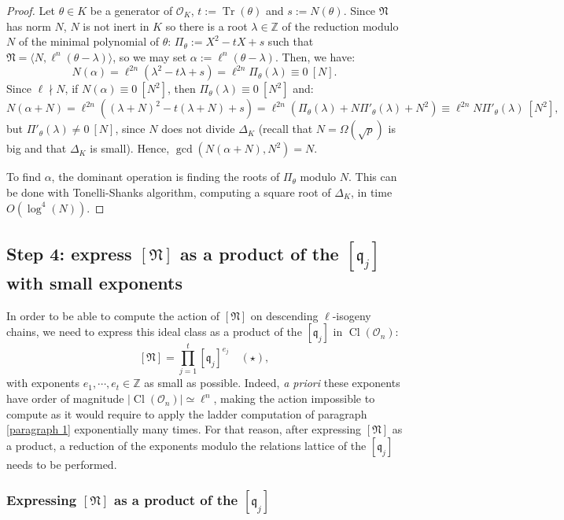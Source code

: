 \documentclass[a4paper,10pt]{report}
\theoremstyle{definition}
\theoremstyle{plain}
\theoremstyle{definition}
\newcommand{\Z}{\mathbb{Z}}
\newcommand{\mO}{\mathcal{O}}
\renewcommand{\(}{\left(}
\renewcommand{\)}{\right)}
\newcommand{\mf}[1]{\mathfrak{#1}}
\DeclareMathOperator{\Tr}{Tr}
\DeclareMathOperator{\Cl}{Cl}
\begin{document}
\begin{proof}
Let $\theta\in K$ be a generator of $\mO_K$, $t:=\Tr(\theta)$ and $s:=N(\theta)$. Since $\mf{N}$ has norm $N$, $N$ is not inert in $K$ so there is a root $\lambda\in\Z$ of the reduction modulo $N$ of the minimal polynomial of $\theta$: $\Pi_\theta:=X^2-tX+s$ such that $\mf{N}=\langle N,\ell^n(\theta-\lambda)\rangle$, so we may set $\alpha:=\ell^n(\theta-\lambda)$. Then, we have:
\[N(\alpha)=\ell^{2n}(\lambda^2-t\lambda+s)=\ell^{2n}\Pi_\theta(\lambda)\equiv 0 \ [N].\]
Since $\ell\nmid N$, if $N(\alpha)\equiv 0 \ [N^2]$, then $\Pi_\theta(\lambda)\equiv 0 \ [N^2]$ and:
\[N(\alpha+N)=\ell^{2n}((\lambda+N)^2-t(\lambda+N)+s)=\ell^{2n}(\Pi_\theta(\lambda)+N\Pi'_\theta(\lambda)+N^2)\equiv \ell^{2n}N\Pi'_\theta(\lambda) \ [N^2],\]
but $\Pi'_\theta(\lambda)\neq 0 \ [N]$, since $N$ does not divide $\Delta_K$ (recall that $N=\Omega(\sqrt{p})$ is big and that $\Delta_K$ is small). Hence, $\gcd(N(\alpha+N),N^2)=N$.  

To find $\alpha$, the dominant operation is finding the roots of $\Pi_\theta$ modulo $N$.  This can be done with Tonelli-Shanks \cite[algorithm 1.5.1]{Cohen1} algorithm, computing a square root of $\Delta_K$, in time $O(\log^4(N))$.
\end{proof}

\subsection{Step 4: express $[\mf{N}]$ as a product of the $[\mf{q}_j]$ with small exponents}\label{paragraph 11}

In order to be able to compute the action of $[\mf{N}]$ on descending $\ell$-isogeny chains, we need to express this ideal class as a product of the $[\mf{q}_j]$ in $\Cl(\mO_n)$:
\[[\mf{N}]=\prod_{j=1}^t[\mf{q}_j]^{e_j}\quad (\star),\]
with exponents $e_1, \cdots, e_{t}\in\Z$ as small as possible. Indeed, \emph{a priori} these exponents have order of magnitude $|\Cl(\mO_n)|\simeq\ell^n$, making the action impossible to compute as it would require to apply the ladder computation of paragraph \ref{paragraph 1} exponentially many times. For that reason, after expressing $[\mf{N}]$ as a product, a reduction of the exponents modulo the relations lattice of the $[\mf{q}_j]$ needs to be performed.

\subsubsection{Expressing $[\mf{N}]$ as a product of the $[\mf{q}_j]$}
\end{document}
